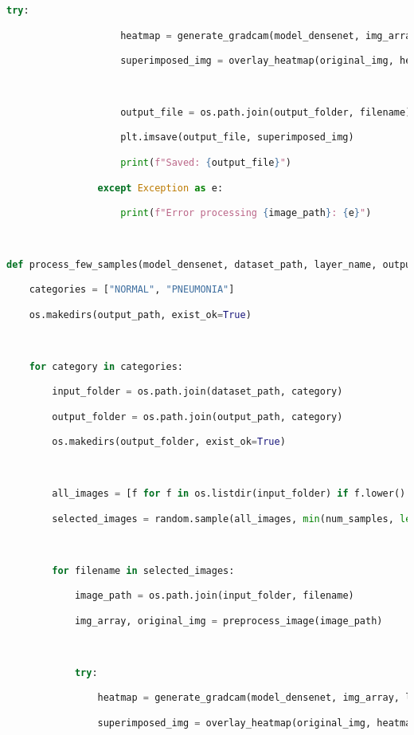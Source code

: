 \documentclass{article}
\begin{document}
\begin{lstlisting}[style=mystyle,language=Python]
                try:

                    heatmap = generate_gradcam(model_densenet, img_array, layer_name)

                    superimposed_img = overlay_heatmap(original_img, heatmap)



                    output_file = os.path.join(output_folder, filename)

                    plt.imsave(output_file, superimposed_img)

                    print(f"Saved: {output_file}")

                except Exception as e:

                    print(f"Error processing {image_path}: {e}")



def process_few_samples(model_densenet, dataset_path, layer_name, output_path, num_samples=5):

    categories = ["NORMAL", "PNEUMONIA"]

    os.makedirs(output_path, exist_ok=True)



    for category in categories:

        input_folder = os.path.join(dataset_path, category)

        output_folder = os.path.join(output_path, category)

        os.makedirs(output_folder, exist_ok=True)



        all_images = [f for f in os.listdir(input_folder) if f.lower().endswith(('.jpg', '.jpeg', '.png'))]

        selected_images = random.sample(all_images, min(num_samples, len(all_images)))



        for filename in selected_images:

            image_path = os.path.join(input_folder, filename)

            img_array, original_img = preprocess_image(image_path)



            try:

                heatmap = generate_gradcam(model_densenet, img_array, layer_name)

                superimposed_img = overlay_heatmap(original_img, heatmap)




\end{lstlisting}
\end{document}
